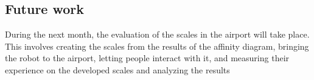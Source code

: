 \subsection{Future work}
During the next month, the evaluation of the scales in the airport will take place. This involves creating the scales from the results of the affinity diagram, bringing the robot to the airport, letting people interact with it, and measuring their experience on the developed scales and analyzing the results

